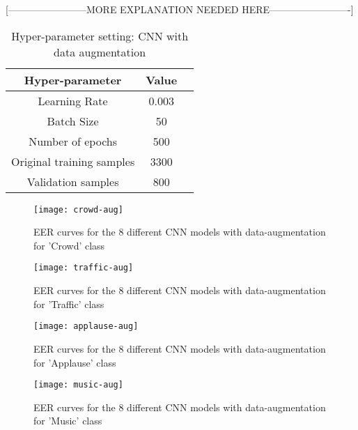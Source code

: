 [------------------------MORE EXPLANATION NEEDED HERE-------------------------]

\begin{table}[tb]
\caption[Hyper-paramter setting: CNN with data augmentation]{Hyper-parameter setting: CNN with data augmentation}
\label{tab:cnn_aug_db2}
\centering
\begin{tabular}{ccc}
\toprule
Hyper-parameter & Value  \\
\midrule
Learning Rate	& 0.003\\
Batch Size	& 50\\
Number of epochs & 500\\
Original training samples 	& 3300\\
Validation samples & 800\\
\bottomrule 
\end{tabular}
\end{table}


\begin{figure}[!htb] 
\centering 
\texttt{[image: crowd-aug]}
\caption[EER curves for the 8 different CNN models with data-augmentation for 'Crowd' class]{EER curves for the 8 different CNN models with data-augmentation for 'Crowd' class}
\label{fig:crowd-aug} 
\end{figure}

\begin{figure}[!htb] 
\centering 
\texttt{[image: traffic-aug]}
\caption[EER curves for the 8 different CNN models with data-augmentation for 'Traffic' class]{EER curves for the 8 different CNN models with data-augmentation for 'Traffic' class}
\label{fig:traffic-aug} 
\end{figure}

\begin{figure}[!htb] 
\centering 
\texttt{[image: applause-aug]}
\caption[EER curves for the 8 different CNN models with data-augmentation for 'Applause' class]{EER curves for the 8 different CNN models with data-augmentation for 'Applause' class}
\label{fig:applause-aug} 
\end{figure}

\begin{figure}[!htb] 
\centering 
\texttt{[image: music-aug]}
\caption[EER curves for the 8 different CNN models with data-augmentation for 'Music' class]{EER curves for the 8 different CNN models with data-augmentation for 'Music' class}
\label{fig:music-aug} 
\end{figure}

